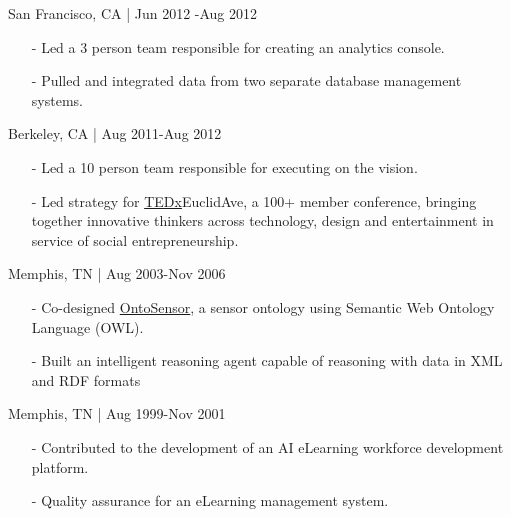 \documentclass[11pt,article,oneside]{memoir}
\begin{document}
 \hfill San Francisco, CA | Jun 2012 -Aug 2012
\begin{itemize}[nolistsep]
\item[-]Led a 3 person team responsible for creating an analytics console.
\item[-]Pulled and integrated data from two separate database management systems.
\end{itemize} 

 \hfill Berkeley, CA | Aug 2011-Aug 2012
\begin{itemize}[noitemsep,nolistsep]
\item[-]Led a 10 person team responsible for executing on the vision.
\item[-]Led strategy for \href{http://www.ted.com/tedx/events/3790}{TEDx}EuclidAve, a 100+ member conference, bringing together innovative thinkers across technology, design and entertainment in service of social entrepreneurship.
\end{itemize}

 \hfill Memphis, TN | Aug 2003-Nov 2006
\begin{itemize}[nolistsep]
\item[-]Co-designed \href{https://scholar.google.com/scholar?hl=en&q=Building+a+Sensor+Ontology\%3A+A+Practical+Approach+Leveraging+ISO+and+OGC+Models.&btnG=&as_sdt=1\%2C43&as_sdtp=}{OntoSensor}, a sensor ontology using Semantic Web Ontology Language (OWL).
\item[-]Built an intelligent reasoning agent capable of reasoning with data in XML and RDF formats
\end{itemize}

 \hfill Memphis, TN | Aug 1999-Nov 2001
\begin{itemize}[nolistsep]
\item[-]Contributed to the development of an AI eLearning workforce development platform.
\item[-]Quality assurance for an eLearning management system.
\end{itemize} 

\bigskip



\end{document}
